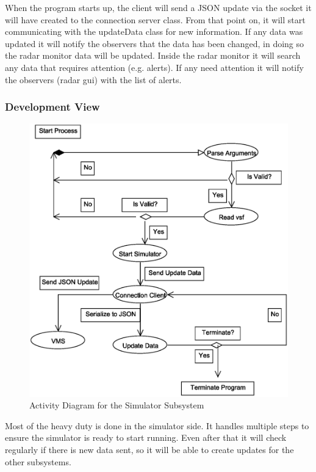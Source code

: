 \documentclass{article}
\begin{document}
When the program starts up, the client will send a JSON update via the socket it will have created to the connection server class. From that point on, it will start communicating with the updateData class for new information. If any data was updated it will notify the observers that the data has been changed, in doing so the radar monitor data will be updated. Inside the radar monitor it will search any data that requires attention (e.g. alerts). If any need attention it will notify the observers (radar gui) with the list of alerts.

\subsubsection{Development View} %

\begin{figure}[!htb]
\caption{Activity Diagram for the Simulator Subsystem}
\centering
\includegraphics[scale=0.3]{diagrams/simulator-acitivity-diagram.eps}
\end{figure}

Most of the heavy duty is done in the simulator side. It handles multiple steps to ensure the simulator is ready to start running. Even after that it will check regularly if there is new data sent, so it will be able to create updates for the other subsystems.
\end{document}
